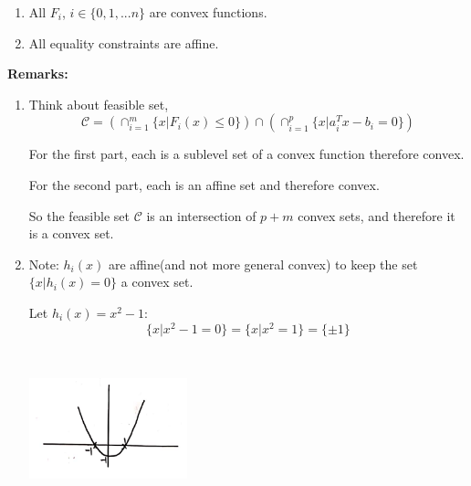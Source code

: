 \begin{enumerate}
	\item All $F_i$, $i\in \{0,1,...n \}$ are convex functions.
	\item All equality constraints are affine.
\end{enumerate}


%	

\textbf{Remarks:}
\begin{enumerate}
	\item Think about feasible set,
	\begin{equation*}
	\mathcal{C} = ( \cap^m_{i=1}\{x\vert F_i(x) \leq 0 \} ) \cap (\cap^p_{i=1}\{x\vert a_i^Tx - b_i = 0 \})
	\end{equation*}
	
	For the first part, each is a sublevel set of a convex function therefore convex.
	
	For the second part, each is an affine set and therefore convex.
	
    So the feasible set $\mathcal{C}$ is an intersection of $p+m$ convex sets, and therefore it is a convex set.
	
	\item Note: $h_i(x)$ are affine(and not more general convex) to keep the set $\{x\vert h_i(x) = 0 \}$ a convex set. 
	
	Let $h_i(x) = x^2 - 1$: 
	\begin{equation*}
	\{x\vert x^2 - 1 = 0 \} = \{x\vert x^2 = 1 \} = \{\pm 1 \}
	\end{equation*}
	\begin{marginfigure}
	\centering
	\includegraphics[width=1.8in,height=1.8in]{figures/ch08/figure1111_6.png}
	\end{marginfigure}
\end{enumerate}

